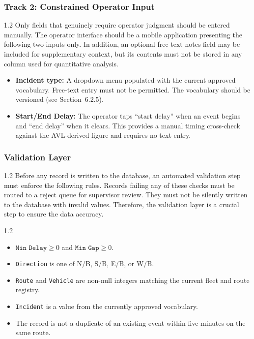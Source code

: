 \documentclass[11pt]{article}
\begin{document}
\subsubsection{Track 2: Constrained Operator Input}
\vspace{-0.25em}
\begin{spacing}{1.2}
Only fields that genuinely require operator judgment should be entered manually. The operator
interface should be a mobile application presenting the following two inputs only. In addition,
an optional free-text notes field may be included for supplementary context, but its contents
must not be stored in any column used for quantitative analysis.
    
\begin{itemize}[leftmargin=2em]
    \item \textbf{Incident type:} A dropdown menu populated with the current approved vocabulary.
    Free-text entry must not be permitted. The vocabulary should be versioned (see
    Section~6.2.5).
    \item \textbf{Start/End Delay:} The operator taps ``start delay'' when an event begins and ``end
    delay'' when it clears. This provides a manual timing cross-check against the AVL-derived
    figure and requires no text entry.
\end{itemize}
\end{spacing}
\vspace{-0.5em}

\subsubsection{Validation Layer}
\vspace{-0.25em}
\begin{spacing}{1.2}
Before any record is written to the database, an automated validation step must enforce the
following rules. Records failing any of these checks must be routed to a reject queue for 
supervisor review. They must not be silently written to the database with invalid values.
Therefore, the validation layer is a crucial step to ensure the data accuracy.
\end{spacing}
\vspace{-0.5em}
\begin{spacing}{1.2}
\begin{itemize}[leftmargin=2em, itemsep=3pt, topsep=3pt, parsep=0pt]
    \item $\texttt{Min Delay} \geq 0$ and $\texttt{Min Gap} \geq 0$.
    \item \texttt{Direction} is one of N/B, S/B, E/B, or W/B.
    \item \texttt{Route} and \texttt{Vehicle} are non-null integers matching the current fleet and route registry.
    \item \texttt{Incident} is a value from the currently approved vocabulary.
    \item The record is not a duplicate of an existing event within five minutes on the same route.
\end{itemize}
\end{spacing}
\vspace{-0.5em}
\end{document}
